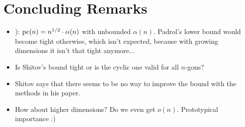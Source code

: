 \section{Concluding Remarks}

\begin{itemize}
  \item \cite[Conjecture 61]{shitov2020sublinear}): $\operatorname{pc}(n) = n^{1/2} \cdot \alpha(n)$ with unbounded $\alpha(n)$.
  Padrol's lower bound would become tight otherwise, which isn't expected, because with growing dimensions it isn't that tight anymore...
  \item Is Shitov's bound tight or is the cyclic one valid for all $n$-gons?
  \item Shitov says that there seems to be no way to improve the bound with the methods in his paper.
  \item How about higher dimensions? Do we even get $o(n)$. Prototypical importance :)
\end{itemize}